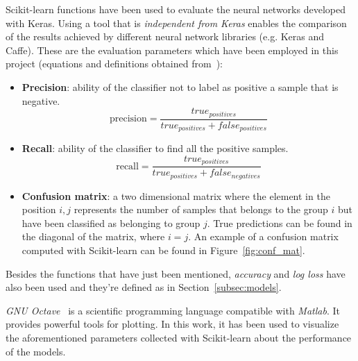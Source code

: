 Scikit-learn functions have been used to evaluate the neural networks developed with Keras. Using a tool that is \emph{independent from Keras} enables the comparison of the results achieved by different neural network libraries (e.g. Keras and Caffe). These are the evaluation parameters which have been employed in this project (equations and definitions obtained from~\cite{scikit-doc}):
\begin{itemize}
	\item \textbf{Precision}: ability of the classifier not to label as positive a sample that is negative.
	\begin{equation}\label{eq:precision}
	\textrm{precision}=\frac{true_{positives}}{true_{positives}+false_{positives}}
	\end{equation}
	
	\item \textbf{Recall}: ability of the classifier to find all the positive samples.
	\begin{equation}\label{eq:recall}
	\textrm{recall}=\frac{true_{positives}}{true_{positives}+false_{negatives}}
	\end{equation}
	
	\item \textbf{Confusion matrix}: a two dimensional matrix where the element in the position $i,j$ represents the number of samples that belongs to the group $i$ but have been classified as belonging to group $j$. True predictions can be found in the diagonal of the matrix, where $i=j$. An example of a confusion matrix computed with Scikit-learn can be found in Figure~\ref{fig:conf_mat}.
\end{itemize}

Besides the functions that have just been mentioned, \emph{accuracy} and \emph{log loss} have also been used and they're defined as in Section~\ref{subsec:models}.

\emph{GNU Octave}~\cite{octave} is a scientific programming language compatible with \emph{Matlab}. It provides powerful tools for plotting. In this work, it has been used to visualize the aforementioned parameters collected with Scikit-learn about the performance of the models.

